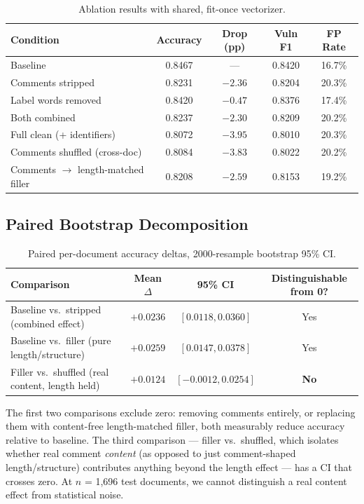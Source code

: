 \documentclass[11pt,a4paper]{article}
\begin{document}
\begin{table}[H]
\centering
\caption{Ablation results with shared, fit-once vectorizer.}
\label{tab:ablation}
\begin{tabular}{lcccc}
\toprule
\textbf{Condition} & \textbf{Accuracy} & \textbf{Drop (pp)} & \textbf{Vuln F1} & \textbf{FP Rate} \\
\midrule
Baseline & 0.8467 & --- & 0.8420 & 16.7\% \\
Comments stripped & 0.8231 & $-2.36$ & 0.8204 & 20.3\% \\
Label words removed & 0.8420 & $-0.47$ & 0.8376 & 17.4\% \\
Both combined & 0.8237 & $-2.30$ & 0.8209 & 20.2\% \\
Full clean (+ identifiers) & 0.8072 & $-3.95$ & 0.8010 & 20.3\% \\
Comments shuffled (cross-doc) & 0.8084 & $-3.83$ & 0.8022 & 20.2\% \\
Comments $\to$ length-matched filler & 0.8208 & $-2.59$ & 0.8153 & 19.2\% \\
\bottomrule
\end{tabular}
\end{table}

\subsection{Paired Bootstrap Decomposition}

\begin{table}[H]
\centering
\caption{Paired per-document accuracy deltas, 2000-resample bootstrap 95\% CI.}
\label{tab:decomp}
\begin{tabular}{lccc}
\toprule
\textbf{Comparison} & \textbf{Mean $\Delta$} & \textbf{95\% CI} & \textbf{Distinguishable from 0?} \\
\midrule
Baseline vs.\ stripped (combined effect) & $+0.0236$ & $[0.0118, 0.0360]$ & Yes \\
Baseline vs.\ filler (pure length/structure) & $+0.0259$ & $[0.0147, 0.0378]$ & Yes \\
Filler vs.\ shuffled (real content, length held) & $+0.0124$ & $[-0.0012, 0.0254]$ & \textbf{No} \\
\bottomrule
\end{tabular}
\end{table}

The first two comparisons exclude zero: removing comments entirely, or replacing them with content-free length-matched filler, both measurably reduce accuracy relative to baseline. The third comparison — filler vs.\ shuffled, which isolates whether real comment \emph{content} (as opposed to just comment-shaped length/structure) contributes anything beyond the length effect — has a CI that crosses zero. At $n$ = 1,696 test documents, we cannot distinguish a real content effect from statistical noise.
\end{document}
